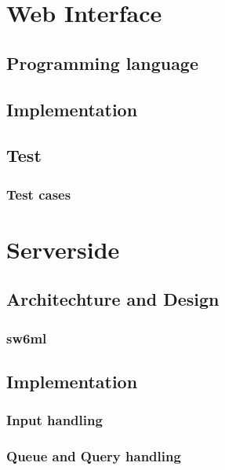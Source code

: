   \section{Web Interface}
    \label{sect:webInterface}
    
      \subsection{Programming language}
        
      \subsection{Implementation}
        
      \subsection{Test}
        
      \subsubsection{Test cases}
        

  \section{Serverside} %
    
    \subsection{Architechture and Design}
      \label{sect:ssArchAndDesign}
	
      \subsubsection{sw6ml} %
	\label{sw6ml}
        
	  
    \subsection{Implementation}
      
      \subsubsection{Input handling} %
        
      \subsubsection{Queue and Query handling} %
	\label{QQHandling}
	
